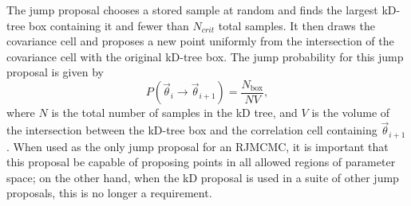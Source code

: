 \documentclass{rsos}
\newcommand{\vtheta}{\vec{\theta}}
\newcommand{\Nbox}{N_\mathrm{box}}
\newcommand{\Vbox}{V_\mathrm{box}}
\newcommand{\ee}{\end{equation}}
\newcommand{\bel}[1]{\begin{equation}\label{#1}}
\newcommand{\ilya}[1]{{\color{red} \bf #1}}
\begin{document}
The jump proposal chooses a stored sample at random and finds the largest kD-tree box containing it and fewer than $N_{crit}$ total samples. It then draws the covariance cell and proposes a new point uniformly from the intersection of the covariance cell with the original kD-tree box.
The jump probability for this jump proposal is given by
%
\bel{modforward} P(\vtheta_i \rightarrow \vtheta_{i+1}) =
\frac{\Nbox}{N V} , \ee
%
where $N$ is the total number of samples in the kD tree, and $V$ is the
volume of the intersection between the kD-tree box and the correlation cell containing $\vtheta_{i+1}$. When used as the only jump proposal for an
RJMCMC, it is important that this proposal be capable of
proposing points in all allowed regions of parameter space; on the
other hand, when the kD proposal is used in a suite of other jump proposals, this is no longer a requirement.

%
%
\end{document}
